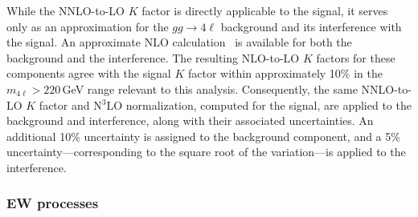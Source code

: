 While the NNLO-to-LO $K$ factor is directly applicable to the signal, it serves only as an approximation for the $gg \to 4\ell$ background and its interference with the signal. An approximate NLO calculation~\cite{Caola:2015psa,Melnikov:2015laa,Campbell:2016ivq,Caola:2016trd} is available for both the background and the interference. The resulting NLO-to-LO $K$ factors for these components agree with the signal $K$ factor within approximately 10\% in the $m_{4\ell} > 220$\,GeV range relevant to this analysis. Consequently, the same NNLO-to-LO $K$ factor and N$^3$LO normalization, computed for the signal, are applied to the background and interference, along with their associated uncertainties. An additional 10\% uncertainty is assigned to the background component, and a 5\% uncertainty—corresponding to the square root of the variation—is applied to the interference.


\subsubsection{EW processes}


